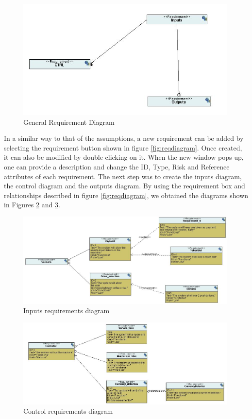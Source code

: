 \documentclass[12pt]{article}
\begin{document}
\begin{figure}[htbp]
\centering
\includegraphics[width=0.99\textwidth]{fig/reqgeneral.jpg}
\caption{General Requirement Diagram} \label{fig:reqgeneral}
\end{figure}


In a similar way to that of the assumptions, a new requirement can be added by selecting the requirement button shown in figure \ref{fig:reqdiagram}. Once created, it can also be modified by double clicking on it. When the new window pops up, one can provide a description and change the ID, Type, Risk and Reference attributes of each requirement.
	The next step was to create the inputs diagram, the control diagram and the outputs diagram. By using the requirement box and relationships described in figure \ref{fig:reqdiagram}, we obtained the diagrams shown in Figures \ref{fig:inputreq} and \ref{fig:controlreq}. 

\begin{figure}[htbp]
\centering
\includegraphics[width=0.99\textwidth]{fig/inputreq.jpg}
\caption{Inputs requirements diagram} \label{fig:inputreq}
\end{figure}

\begin{figure}[htbp]
\centering
\includegraphics[width=0.99\textwidth]{fig/controlreq.jpg}
\caption{Control requirements diagram} \label{fig:controlreq}
\end{figure}
\end{document}
